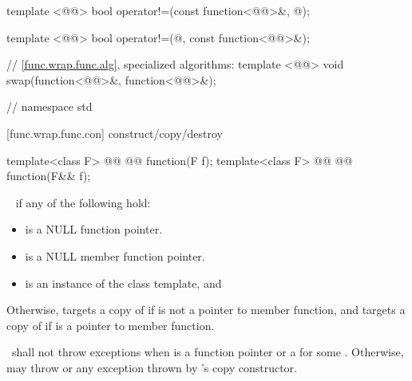 \documentclass[american,twoside]{book}
\begin{document}
\begin{codeblock}
{  template <@@>
    bool operator!=(const function<@@>&, @\unspecnull@);

  template <@@>
    bool operator!=(@\unspecnull@, const function<@@>&);

  // \ref{func.wrap.func.alg}, specialized algorithms:
  template <@@>
    void swap(function<@@>&, function<@@>&);
} // namespace std
\end{codeblock}

[func.wrap.func.con]{ construct/copy/destroy}
\setcounter{Paras}{7}
\begin{itemdecl}
template<class F> 
  @@ 
           @@
  function(F f);
template<class F> 
  @@ 
           @@
  function(F&& f);
\end{itemdecl}

\begin{itemdescr}
\pnum{}

\pnum\postconditions\  if any of the following hold:
\begin{itemize}
\item{ is a NULL function pointer.}
\item{ is a NULL member function pointer.}
\item{ is an instance of the  class template, and
  }
\end{itemize}

\pnum
Otherwise,  targets a copy of 
 if  is
not a pointer to member function, and targets a copy
of  if  is a pointer to member function.

\pnum\throws\ shall not throw exceptions when  is a function pointer 
or a  for some . Otherwise,
may throw  or any exception thrown by 's copy
 constructor.
\end{itemdescr}
\end{document}
